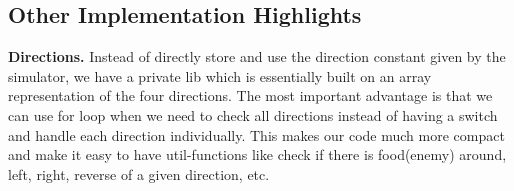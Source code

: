 \subsection{Other Implementation Highlights}
\textbf{Directions.} Instead of directly store and use the direction constant 
given by the simulator, we have a private lib which is essentially built on an array 
representation of the four directions. 
The most important advantage is that we can use for loop when we need to check all directions
instead of having a switch and handle each direction individually.
This makes our code much more compact and make it easy to have util-functions like check if there 
is food(enemy) around, left, right, reverse of a given direction, etc.